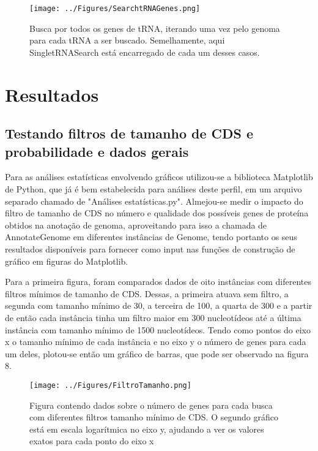 \documentclass[brazilian,12pt,a4paper,final]{article}
\begin{document}
	\begin{figure}[hbtp]
		\begin{center}
			\texttt{[image: ../Figures/SearchtRNAGenes.png]}
			\caption{Busca por todos os genes de tRNA, iterando uma vez pelo genoma para cada tRNA a ser buscado. Semelhamente, aqui SingletRNASearch está encarregado de cada um desses casos.}
			\label{fig}
		\end{center}
	\end{figure}	
	
	\section{Resultados}
	\vspace{0.5cm}
	\subsection{Testando filtros de tamanho de CDS e probabilidade e dados gerais }
	Para as análises estatísticas envolvendo gráficos utilizou-se a biblioteca Matplotlib de Python, que já é bem estabelecida para análises deste perfil, em um arquivo separado chamado de "Análises estatísticas.py". Almejou-se medir o impacto do filtro de tamanho de CDS no número e qualidade dos possíveis genes de proteína obtidos na anotação de genoma, aproveitando para isso a chamada de AnnotateGenome em diferentes instâncias de Genome, tendo portanto os seus resultados disponíveis para fornecer como input nas funções de construção de gráfico em figuras do Matplotlib. 
	
	\vspace{0.5cm}
	
	Para a primeira figura, foram comparados dados de oito instâncias com diferentes filtros mínimos de tamanho de CDS. Dessas, a primeira atuava sem filtro, a segunda com tamanho mínimo de 30, a terceira de 100, a quarta de 300 e a partir de então cada instância tinha um filtro maior em 300 nucleotídeos até a última instância com tamanho mínimo de 1500 nucleotídeos.
	Tendo como pontos do eixo x o tamanho mínimo de cada instância e no eixo y o número de genes para cada um deles, plotou-se então um gráfico de barras, que pode ser observado na figura 8.
	
	\begin{figure}[hbtp]
		\begin{center}
			\texttt{[image: ../Figures/FiltroTamanho.png]}
			\caption{Figura contendo dados sobre o número de genes para cada busca com diferentes filtros tamanho mínimo de CDS. O segundo gráfico está em escala logarítmica no eixo y, ajudando a ver os valores exatos para cada ponto do eixo x}
			\label{fig}
		\end{center}
	\end{figure}
	
\end{document}
